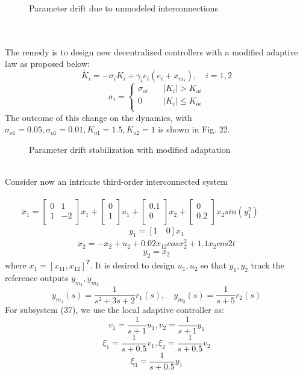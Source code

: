 \documentclass[journal]{IEEEtran}
\begin{document}
\begin{figure}[h]
\end{figure}
\begin{figure}[h]
\caption{Parameter drift due to unmodeled interconnections}
\end{figure}
\\\\
The remedy is to design new decentralized controllers with a modified adaptive law as proposed below: $$\dot{K_i} = -\sigma_i K_i + \gamma_i e_i(e_i+x_{m_i}),\quad i=1,2$$  \[ \sigma_i = \begin{cases} 
      \sigma_{oi} \quad & |K_i| > K_{oi} \\
      0 \quad & |K_i| \leq K_{oi}\\
   \end{cases}
\] 
The outcome of this change on the dynamics, with $\sigma_{o1} = 0.05, \sigma_{o1} = 0.01, K_{o1} = 1.5,  K_{o2} = 1 $ is shown in Fig. 22. 
\begin{figure}[h]
\end{figure}
\begin{figure}[h]
\caption{Parameter drift stabilization with modified adaptation}
\end{figure}
\\Consider now an intricate third-order interconnected system\\\\
$ \qquad \dot{x}_1 = \begin{bmatrix}
0&1 \\1&-2 \\
\end{bmatrix}x_1 + \begin{bmatrix}
0\\1\\
\end{bmatrix}u_1+\begin{bmatrix}
0.1\\0\\
\end{bmatrix}x_2+\begin{bmatrix}
0\\0.2\\
\end{bmatrix}x_2sin(y^2_1)$
\begin{align}y_1 = [1\quad 0]x_1 \end{align}$$\dot{x}_2=-x_2+u_2+0.02x_{12}cosx^2_2+1.1x_2cos2t$$\begin{align}y_2=x_2 \end{align} where $x_1 = [x_{11}, x_{12}]^T$. It is desired to design $u_1,u_2$ so that $y_1,y_2$ track the reference outputs $y_{m_1},y_{m_2}$$$y_{m_1}(s) = \frac{1}{s^2+3s+2}r_1(s), \quad y_{m_2}(s) = \frac{1}{s+5}r_2(s) $$ For subsystem (37), we use the local adaptive controller as: $$v_1 = \frac{1}{s+1}u_1, v_2=\frac{1}{s+1}y_1$$ $$\xi_1 = \frac{1}{s+0.5}v_1, \xi_2 = \frac{1}{s+0.5}v_2$$ $$\xi_3 = \frac{1}{s+0.5}y_1$$
\end{document}
